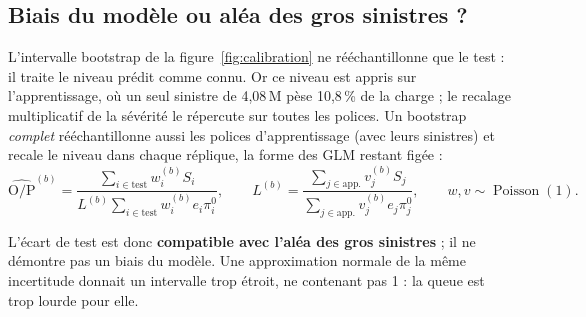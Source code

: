 \documentclass[11pt,a4paper]{article}
\newcommand{\Pois}{\operatorname{Poisson}}
\begin{document}
\subsection*{Biais du modèle ou aléa des gros sinistres ?}\label{sec:grossinistres}
L'intervalle bootstrap de la figure~\ref{fig:calibration} ne rééchantillonne que le test : il traite le niveau prédit comme connu. Or ce niveau est appris sur l'apprentissage, où un seul sinistre de 4,08\,M\texteuro{} pèse 10,8\,\% de la charge ; le recalage multiplicatif de la sévérité le répercute sur toutes les polices. Un bootstrap \emph{complet} rééchantillonne aussi les polices d'apprentissage (avec leurs sinistres) et recale le niveau dans chaque réplique, la forme des GLM restant figée :
\[
\widehat{\mathrm{O/P}}^{(b)}=\frac{\sum_{i\in\text{test}}w_i^{(b)}S_i}{L^{(b)}\sum_{i\in\text{test}}w_i^{(b)}e_i\pi_i^0},\qquad
L^{(b)}=\frac{\sum_{j\in\text{app.}}v_j^{(b)}S_j}{\sum_{j\in\text{app.}}v_j^{(b)}e_j\pi_j^0},\qquad w,v\sim\Pois(1).
\]
\begin{table}[htbp]\centering\small
\tabLLBootstrap
\caption{Intervalles à 95\,\% du ratio de charge observée/prédite sur le test (\llTestOP). Avec le bootstrap complet, \llShareAboveOne{} des répliques ont un ratio au moins égal à 1.}
\end{table}
L'écart de test est donc \textbf{compatible avec l'aléa des gros sinistres} ; il ne démontre pas un biais du modèle. Une approximation normale de la même incertitude donnait un intervalle trop étroit, ne contenant pas 1 : la queue est trop lourde pour elle.
\end{document}
